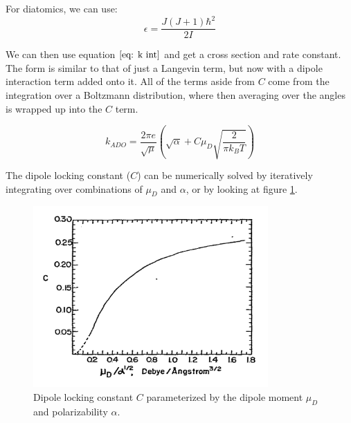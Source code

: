 For diatomics, we can use:
\begin{equation*}
    \epsilon = \frac{J(J+1)\hbar^2}{2I}
\end{equation*}

We can then use equation $\ref{eq: k int}$ and get a cross section and rate constant. The form is similar to that of just a Langevin term, but now with a dipole interaction term added onto it. All of the terms aside from $C$ come from the integration over a Boltzmann distribution, where then averaging over the angles is wrapped up into the $C$ term.

\begin{equation}
    \boxed{k_{ADO} = \frac{2 \pi e}{\sqrt{\mu}}\left(\sqrt{\alpha}+C \mu_D\sqrt{\frac{2}{\pi k_B T}}\right)}
\end{equation}

The dipole locking constant ($C$) can be numerically solved by iteratively integrating over combinations of $\mu_D$ and $\alpha$, or by looking at figure \ref{fig: C}.\cite{Su1973}\cite{Troe1985}

\begin{figure}[H]
	\label{fig: C}
	\centering
	\includegraphics[width=0.8\textwidth]{images/ADO_C.pdf}
	\caption{Dipole locking constant $C$ parameterized by the dipole moment $\mu_D$ and polarizability $\alpha$.\cite{Su1973}}
\end{figure}

